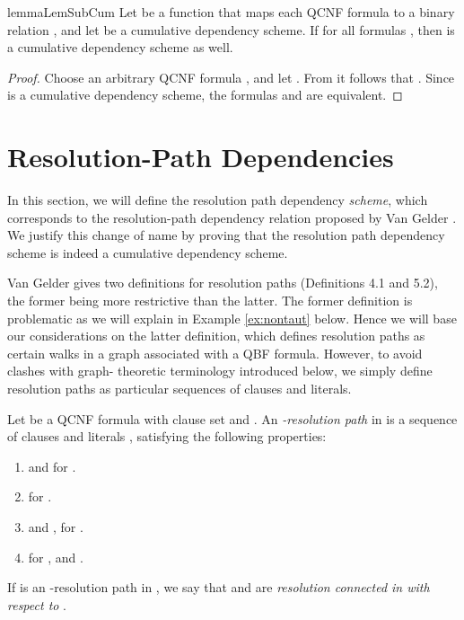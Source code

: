 \documentclass{llncs}
\newcommand{\longversion}[1]{#1}
\newcommand{\shortversion}[1]{}
\def\hy{\hbox{-}\nobreak\hskip0pt} \newcommand{\ellipsis}{}
\begin{document}
\begin{restatable}{lemma}{LemSubCum} \label{lem:subcum}\shortversion{\textup{()}}
  Let  be a function that maps each QCNF formula  to a binary
  relation , and let  be a cumulative
  dependency scheme. If  for all formulas
  , then  is a cumulative dependency scheme as well.
\end{restatable}
\longversion{ \longversion{\begin{sloppypar}}
\begin{proof}
  Choose an arbitrary QCNF formula , and let . From  it follows that
  . Since  is a cumulative
  dependency scheme, the formulas  and  are
  equivalent.
\end{proof}
\longversion{\end{sloppypar}}
 }
\section{Resolution\hy Path Dependencies}
In this section, we will define the resolution path dependency \emph{scheme},
which corresponds to the resolution\hy path dependency relation proposed by
Van Gelder \cite{VanGelder11}. We justify this change of name by proving that
the resolution path dependency scheme is indeed a cumulative dependency
scheme.

Van Gelder \cite{VanGelder11} gives two definitions for resolution paths
(Definitions 4.1 and 5.2), the former being more restrictive than the
latter. The former definition is problematic as we will explain in Example
\ref{ex:nontaut} below. Hence we will base our considerations on the latter
definition, which defines resolution paths as certain walks in a graph
associated with a QBF formula. However, to avoid clashes with graph\hy
theoretic terminology introduced below, we simply define resolution paths as
particular sequences of clauses and literals.

\begin{definition} \label{def:rconnected} Let  be a
  QCNF formula with clause set  and . An
  \emph{\hy resolution path} in  is a sequence of clauses and
  literals \hskip
  0pt, satisfying the following properties:
  \begin{enumerate}
  \item  and  for .
  \item  for .
  \item  and , for .
  \item  for , and
    .
\end{enumerate}
If  is an \hy resolution path in , we say
that  and  are \emph{resolution connected in  with
  respect to }.
\end{definition}
\end{document}
